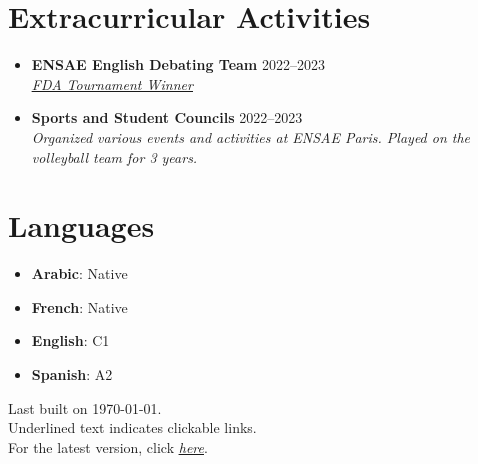 \documentclass[letterpaper,11pt,twocolumn]{article}
\newcommand{\resumeSubheading}[4]{
	\vspace{-2pt}\item \textbf{#1} \hfill #2 \\
	\textit{\small #3} \hfill \textit{\small #4} 
	\vspace{-7pt}
}
\begin{document}
\section{Extracurricular Activities}
\begin{itemize}[leftmargin=*]
	\resumeSubheading
	{ENSAE English Debating Team}{2022--2023}{\href{https://www.frenchdebatingassociation.fr/\#fda}{\underline{FDA Tournament Winner}} }{}
	\resumeSubheading
	{Sports and Student Councils}{2022--2023}{Organized various events and activities at ENSAE Paris. Played on the volleyball team for 3 years.}{}
\end{itemize}

\section{Languages}
\begin{itemize}[leftmargin=*]
	\item \textbf{Arabic}: Native
	\item \textbf{French}: Native
	\item \textbf{English}: C1
	\item \textbf{Spanish}: A2
\end{itemize}

\begin{flushright}
	\vspace{-4pt}
	\color{gray}
	Last built on \today.  \\
	Underlined text indicates clickable links. \\
	For the latest version, click \href{https://machtayassine.github.io/resume/resume_ymachta.pdf}{\underline{\textit{here}}}.
\end{flushright}
\end{document}
